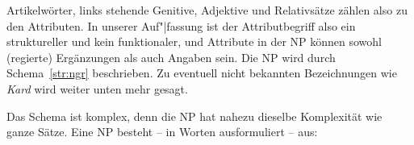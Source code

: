 
Artikelwörter, links stehende Genitive, Adjektive und Relativsätze zählen also zu den Attributen.
In unserer Auf"|fassung ist der Attributbegriff also ein struktureller und kein funktionaler, und Attribute in der NP können sowohl (regierte) Ergänzungen als auch Angaben sein.
Die NP wird durch Schema~\ref{str:ngr} beschrieben.
Zu eventuell nicht bekannten Bezeichnungen wie \textit{Kard} wird weiter unten mehr gesagt.



Das Schema ist komplex, denn die NP hat nahezu dieselbe Komplexität wie ganze Sätze.
Eine NP besteht -- in Worten ausformuliert -- aus:



